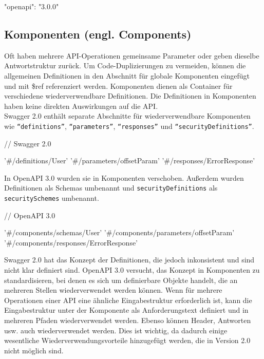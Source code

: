 \begin{LaTeXCode}[caption={Version von Open API},captionpos=b, label=LaTeXCode:openapi3.0-1][numbers=none]
"openapi": "3.0.0"\\
\end{LaTeXCode}

\subsection{Komponenten (engl. Components)}

Oft haben mehrere API-Operationen gemeinsame Parameter oder geben dieselbe Antwortstruktur zurück. Um Code-Duplizierungen zu vermeiden, können die allgemeinen Definitionen in den Abschnitt für globale Komponenten eingefügt und mit \$ref referenziert werden. Komponenten dienen als Container für verschiedene wiederverwendbare Definitionen. Die Definitionen in Komponenten haben keine direkten Auswirkungen auf die API\cite{openapicomponents17}.\\

Swagger 2.0 enthält separate Abschnitte für wiederverwendbare Komponenten wie \texttt{"`definitions"'}, \texttt{"`parameters"'}, \texttt{"`responses"'} und \texttt{"`securityDefinitions"'}.\\

\begin{LaTeXCode}[caption={Open API 2.0 - Komponenten\cite{openapicomponents17}},captionpos=b, label=LaTeXCode:openapi3.0-2][numbers=none]
// Swagger 2.0    

'#/definitions/User'
'#/parameters/offsetParam'
'#/responses/ErrorResponse'
\end{LaTeXCode}

In OpenAPI 3.0 wurden sie in Komponenten verschoben. Außerdem wurden Definitionen als Schemas umbenannt und \texttt{securityDefinitions} als \texttt{securitySchemes} umbenannt.\\

\begin{LaTeXCode}[caption={Open API 3.0 - Komponenten\cite{openapicomponents17}},captionpos=b, label=LaTeXCode:openapi3.0-3][numbers=none]
// OpenAPI 3.0

'#/components/schemas/User'
'#/components/parameters/offsetParam'
'#/components/responses/ErrorResponse'
\end{LaTeXCode}

Swagger 2.0 hat das Konzept der Definitionen, die jedoch inkonsistent und sind nicht klar definiert sind. OpenAPI 3.0 versucht, das Konzept in Komponenten zu standardisieren, bei denen es sich um definierbare Objekte handelt, die an mehreren Stellen wiederverwendet werden können. Wenn für mehrere Operationen einer API eine ähnliche Eingabestruktur erforderlich ist, kann die Eingabestruktur unter der Komponente als Anforderungstext definiert und in mehreren Pfaden wiederverwendet werden. Ebenso können Header, Antworten usw. auch wiederverwendet werden. Dies ist wichtig, da dadurch einige wesentliche Wiederverwendungsvorteile hinzugefügt werden, die in Version 2.0 nicht möglich sind.\\

